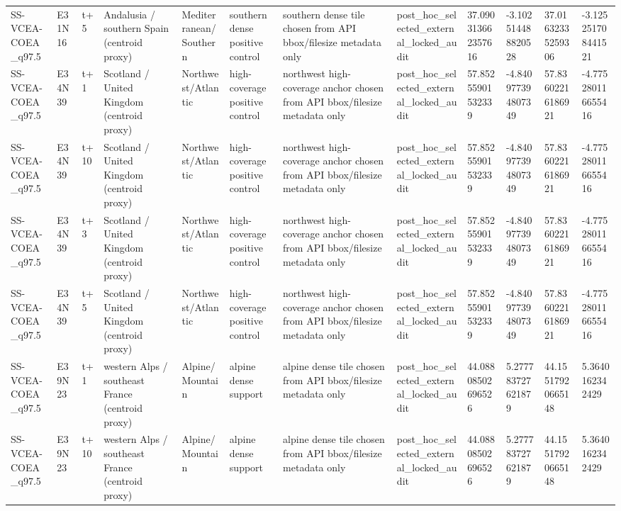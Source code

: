 \begin{landscape}
\begin{longtable}{llllllllllll}
SS-VCEA-COEA\_q97.5 & E31N16 & t+5 & Andalusia / southern Spain (centroid proxy) & Mediterranean/Southern & southern dense positive control & southern dense tile chosen from API bbox/filesize metadata only & post\_hoc\_selected\_external\_locked\_audit & 37.090313662357616 & -3.102514488820528 & 37.01632335259306 & -3.125251708441521 \\
SS-VCEA-COEA\_q97.5 & E34N39 & t+1 & Scotland / United Kingdom (centroid proxy) & Northwest/Atlantic & high-coverage positive control & northwest high-coverage anchor chosen from API bbox/filesize metadata only & post\_hoc\_selected\_external\_locked\_audit & 57.85255901532339 & -4.840977394807349 & 57.83602216186921 & -4.775280116655416 \\
SS-VCEA-COEA\_q97.5 & E34N39 & t+10 & Scotland / United Kingdom (centroid proxy) & Northwest/Atlantic & high-coverage positive control & northwest high-coverage anchor chosen from API bbox/filesize metadata only & post\_hoc\_selected\_external\_locked\_audit & 57.85255901532339 & -4.840977394807349 & 57.83602216186921 & -4.775280116655416 \\
SS-VCEA-COEA\_q97.5 & E34N39 & t+3 & Scotland / United Kingdom (centroid proxy) & Northwest/Atlantic & high-coverage positive control & northwest high-coverage anchor chosen from API bbox/filesize metadata only & post\_hoc\_selected\_external\_locked\_audit & 57.85255901532339 & -4.840977394807349 & 57.83602216186921 & -4.775280116655416 \\
SS-VCEA-COEA\_q97.5 & E34N39 & t+5 & Scotland / United Kingdom (centroid proxy) & Northwest/Atlantic & high-coverage positive control & northwest high-coverage anchor chosen from API bbox/filesize metadata only & post\_hoc\_selected\_external\_locked\_audit & 57.85255901532339 & -4.840977394807349 & 57.83602216186921 & -4.775280116655416 \\
SS-VCEA-COEA\_q97.5 & E39N23 & t+1 & western Alps / southeast France (centroid proxy) & Alpine/Mountain & alpine dense support & alpine dense tile chosen from API bbox/filesize metadata only & post\_hoc\_selected\_external\_locked\_audit & 44.08808502696526 & 5.277783727621879 & 44.15517920665148 & 5.3640162342429 \\
SS-VCEA-COEA\_q97.5 & E39N23 & t+10 & western Alps / southeast France (centroid proxy) & Alpine/Mountain & alpine dense support & alpine dense tile chosen from API bbox/filesize metadata only & post\_hoc\_selected\_external\_locked\_audit & 44.08808502696526 & 5.277783727621879 & 44.15517920665148 & 5.3640162342429 \\

\end{longtable}
\end{landscape}
